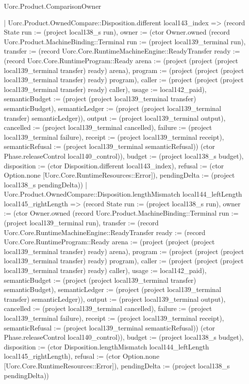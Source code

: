 \begin{lexlean}{Uorc.Product.ComparisonOwner}
\begin{semanticmodule}
{    | Uorc.Product.OwnedCompare::Disposition.different local143_index => (record State {run := (project local138_s run), owner := (ctor Owner.owned (record Uorc.Product.MachineBinding::Terminal {run := (project local139_terminal run), transfer := (record Uorc.Core.RuntimeMachineEngine::ReadyTransfer {ready := (record Uorc.Core.RuntimeProgram::Ready {arena := (project (project (project local139_terminal transfer) ready) arena), program := (project (project (project local139_terminal transfer) ready) program), caller := (project (project (project local139_terminal transfer) ready) caller), usage := local142_paid}), semanticBudget := (project (project local139_terminal transfer) semanticBudget), semanticLedger := (project (project local139_terminal transfer) semanticLedger)}), output := (project local139_terminal output), cancelled := (project local139_terminal cancelled), failure := (project local139_terminal failure), receipt := (project local139_terminal receipt), semanticRefusal := (project local139_terminal semanticRefusal)}) (ctor Phase.releaseControl local140_control)), budget := (project local138_s budget), disposition := (ctor Disposition.different local143_index), refusal := (ctor Option.none [Uorc.Core.RuntimeResources::Error]), pendingDelta := (project local138_s pendingDelta)})
    | Uorc.Product.OwnedCompare::Disposition.lengthMismatch local144_leftLength local145_rightLength => (record State {run := (project local138_s run), owner := (ctor Owner.owned (record Uorc.Product.MachineBinding::Terminal {run := (project local139_terminal run), transfer := (record Uorc.Core.RuntimeMachineEngine::ReadyTransfer {ready := (record Uorc.Core.RuntimeProgram::Ready {arena := (project (project (project local139_terminal transfer) ready) arena), program := (project (project (project local139_terminal transfer) ready) program), caller := (project (project (project local139_terminal transfer) ready) caller), usage := local142_paid}), semanticBudget := (project (project local139_terminal transfer) semanticBudget), semanticLedger := (project (project local139_terminal transfer) semanticLedger)}), output := (project local139_terminal output), cancelled := (project local139_terminal cancelled), failure := (project local139_terminal failure), receipt := (project local139_terminal receipt), semanticRefusal := (project local139_terminal semanticRefusal)}) (ctor Phase.releaseControl local140_control)), budget := (project local138_s budget), disposition := (ctor Disposition.lengthMismatch local144_leftLength local145_rightLength), refusal := (ctor Option.none [Uorc.Core.RuntimeResources::Error]), pendingDelta := (project local138_s pendingDelta)})
}
\end{semanticmodule}
\end{lexlean}

